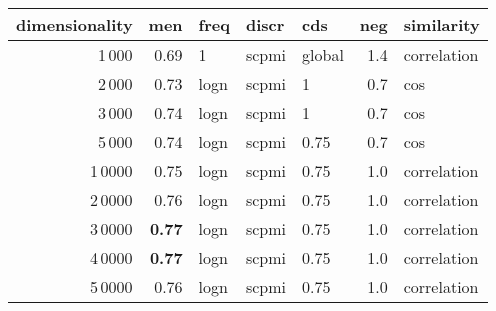 \begin{tabular}{rrlllrl}
\toprule
 dimensionality &   men &  freq &  discr &     cds &  neg &   similarity \\
\midrule
           1\,000 &  0.69 &     1 &  scpmi &  global &  1.4 &  correlation \\
           2\,000 &  0.73 &  logn &  scpmi &       1 &  0.7 &          cos \\
           3\,000 &  0.74 &  logn &  scpmi &       1 &  0.7 &          cos \\
           5\,000 &  0.74 &  logn &  scpmi &    0.75 &  0.7 &          cos \\
          1\,0000 &  0.75 &  logn &  scpmi &    0.75 &  1.0 &  correlation \\
          2\,0000 &  0.76 &  logn &  scpmi &    0.75 &  1.0 &  correlation \\
          3\,0000 &  \textbf{0.77} &  logn &  scpmi &    0.75 &  1.0 &  correlation \\
          4\,0000 &  \textbf{0.77} &  logn &  scpmi &    0.75 &  1.0 &  correlation \\
          5\,0000 &  0.76 &  logn &  scpmi &    0.75 &  1.0 &  correlation \\
\bottomrule
\end{tabular}
